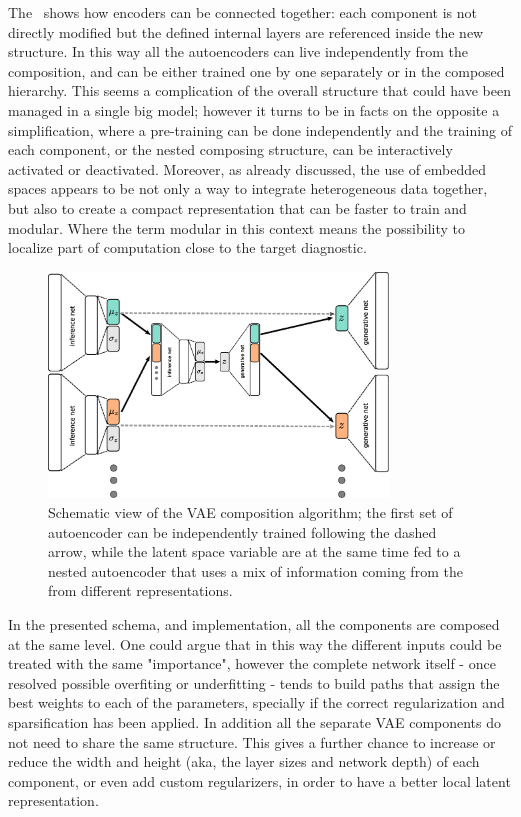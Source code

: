The~\Figure{\ref{fig:VAE_compose}} shows how encoders can be connected together: each component is not directly modified but the defined internal layers are referenced inside the new structure. In this way all the autoencoders can live independently from the composition, and can be either trained one by one separately or in the composed hierarchy. This seems a complication of the overall structure that could have been managed in a single big model; however it turns to be in facts on the opposite a simplification, where a pre-training can be done independently and the training of each component, or the nested composing structure, can be interactively activated or deactivated.
Moreover, as already discussed, the use of embedded spaces appears to be not only a way to integrate heterogeneous data together, but also to create a compact representation that can be faster to train and modular. Where the term modular in this context means the possibility to localize part of computation close to the target diagnostic.
\begin{figure}
    \centering
    \includegraphics[height=6cm]{img/3_ML/VAE_COMPOSE.eps}
    \caption{Schematic view of the VAE composition algorithm; the first set of autoencoder can be independently trained following the dashed arrow, while the latent space variable are at the same time fed to a nested autoencoder that uses a mix of information coming from the from different representations. }
    \label{fig:VAE_compose}
\end{figure}
%
In the presented schema, and implementation, all the components are composed at the same level. One could argue that in this way the different inputs could be treated with the same "importance", however the complete network itself - once resolved possible overfiting or underfitting - tends to build paths that assign the best weights to each of the parameters, specially if the correct regularization and sparsification has been applied. In addition all the separate \acs{VAE} components do not need to share the same structure. This gives a further chance to increase or reduce the width and height (aka, the layer sizes and network depth) of each component, or even add custom regularizers, in order to have a better local latent representation. 

